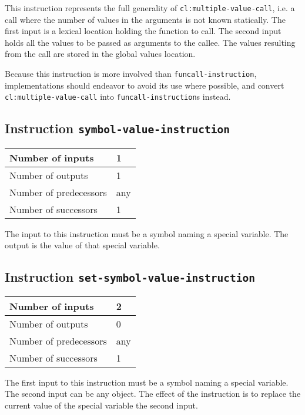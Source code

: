 This instruction represents the full generality of
\texttt{cl:multiple-value-call}, i.e. a call where the number of
values in the arguments is not known statically. The first input is a
lexical location holding the function to call.  The second input holds
all the values to be passed as arguments to the callee.  The values
resulting from the call are stored in the global values location.

Because this instruction is more involved than
\texttt{funcall-instruction}, implementations should endeavor to
avoid its use where possible, and convert
\texttt{cl:multiple-value-call} into \texttt{funcall-instruction}s
instead.

\subsection{Instruction \texttt{symbol-value-instruction}}
\label{hir-instruction-symbol-value}

\begin{tabular}{|l|l|}
\hline
Number of inputs & 1\\
\hline
Number of outputs & 1\\
\hline
Number of predecessors & any\\
\hline
Number of successors & 1\\
\hline
\end{tabular}

The input to this instruction must be a symbol naming a special
variable.  The output is the value of that special variable.

\subsection{Instruction \texttt{set-symbol-value-instruction}}
\label{hir-instruction-set-symbol-value}

\begin{tabular}{|l|l|}
\hline
Number of inputs & 2\\
\hline
Number of outputs & 0\\
\hline
Number of predecessors & any\\
\hline
Number of successors & 1\\
\hline
\end{tabular}

The first input to this instruction must be a symbol naming a
special variable.  The second input can be any object.  The effect of
the instruction is to replace the current value of the special
variable the second input.

